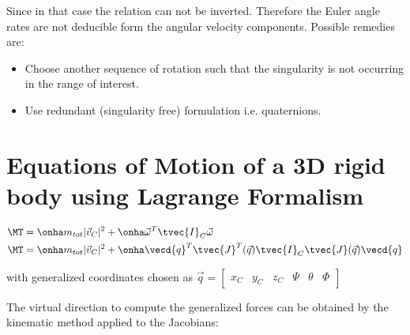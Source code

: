 \documentclass[10pt,a4paper]{scrartcl}
\begin{document}
\begin{multicols*}{2}

Since in that case the relation can not be inverted. Therefore the Euler angle rates are not deducible form the angular velocity components. Possible remedies are:

\begin{itemize}
\item Choose another sequence of rotation such that the singularity is not occurring in the range of interest.
\item Use redundant (singularity free) formulation i.e. quaternions.
\end{itemize}

\section{Equations of Motion of a 3D rigid body using Lagrange Formalism}

\begin{align*}
\MT&=\onha m_{tot}|\vec{v}_C|^2+\onha\vec{\omega}^T\tvec{I}_C\vec{\omega}\\
\MT&=\onha m_{tot}|\vec{v}_C|^2+\onha\vecd{q}^T\tvec{J}^T(\vec{q})\tvec{I}_C\tvec{J}(\vec{q})\vecd{q}
\end{align*}

with generalized coordinates chosen as $\vec{q}=\begin{bmatrix}
x_C&y_C&z_C&\Psi&\theta&\Phi
\end{bmatrix}$

The virtual direction to compute the generalized forces can be obtained by the kinematic method applied to the Jacobians:


\end{multicols*}
\end{document}
